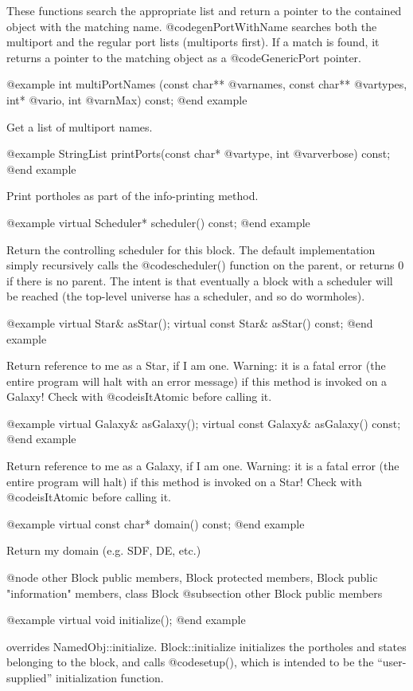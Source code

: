These functions search the appropriate list and return a pointer
to the contained object with the matching name.  @code{genPortWithName}
searches both the multiport and the regular port lists (multiports
first).  If a match is found, it returns a pointer to the matching
object as a @code{GenericPort} pointer.

@example
int multiPortNames (const char** @var{names}, const char** @var{types},
                    int* @var{io}, int @var{nMax}) const;
@end example

Get a list of multiport names.

@example
StringList printPorts(const char* @var{type}, int @var{verbose}) const;
@end example

Print portholes as part of the info-printing method.

@example
virtual Scheduler* scheduler() const;
@end example

Return the controlling scheduler for this block.  The default
implementation simply recursively calls the @code{scheduler()} function on the parent, or returns 0
if there is no parent.  The intent is that eventually a block with
a scheduler will be reached (the top-level universe has a scheduler,
and so do wormholes).

@example
virtual Star& asStar();
virtual const Star& asStar() const;
@end example

Return reference to me as a Star, if I am one.  Warning: it is a
fatal error (the entire program will halt with an error message)
if this method is invoked on a Galaxy!  Check with @code{isItAtomic}
before calling it.

@example
virtual Galaxy& asGalaxy();
virtual const Galaxy& asGalaxy() const;
@end example

Return reference to me as a Galaxy, if I am one.  Warning: it is a
fatal error (the entire program will halt) if this method is invoked
on a Star!  Check with @code{isItAtomic} before calling it.

@example
virtual const char* domain() const;
@end example

Return my domain (e.g. SDF, DE, etc.)

@node other Block public members, Block protected members, Block public "information" members, class Block
@subsection other Block public members

@example
virtual void initialize();
@end example

overrides NamedObj::initialize.  Block::initialize initializes the
portholes and states belonging to the block, and calls @code{setup()}, which
is intended to be the ``user-supplied'' initialization function.

